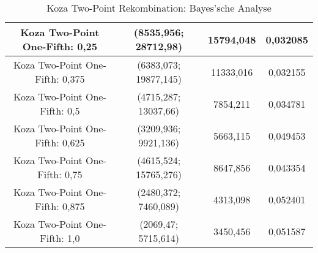 \begin{table}[H]
\begin{tabular}{c | c | c | c}
		\hline
		Koza Two-Point One-Fifth: 0,25 & (\color{red}8535,956\color{black}; \color{red}28712,98\color{black}) & \color{red}15794,048\color{black} & \color{red}0,032085\color{black}\\
		\hline
		Koza Two-Point One-Fifth: 0,375 & (6383,073; 19877,145) & 11333,016 & \color{red}0,032155\color{black}\\
		\hline
		Koza Two-Point One-Fifth: 0,5 & (4715,287; 13037,66) & 7854,211 & 0,034781\\
		\hline
		Koza Two-Point One-Fifth: 0,625 & (3209,936; 9921,136) & 5663,115 & 0,049453\\
		\hline
		Koza Two-Point One-Fifth: 0,75 & (4615,524; 15765,276) & 8647,856 & 0,043354\\
		\hline
		Koza Two-Point One-Fifth: 0,875 & (2480,372; \color{Green}7460,089\color{black}) & 4313,098 & \color{Green}0,052401\color{black}\\
		\hline
		Koza Two-Point One-Fifth: 1,0 & (\color{Green}2069,47\color{black}; \color{Green}5715,614\color{black}) & \color{Green}3450,456\color{black} & 0,051587\\
	\end{tabular}
	\caption{Koza Two-Point Rekombination: Bayes'sche Analyse}
	\label{table:kozaTwoPointBayesian}
\end{table}
